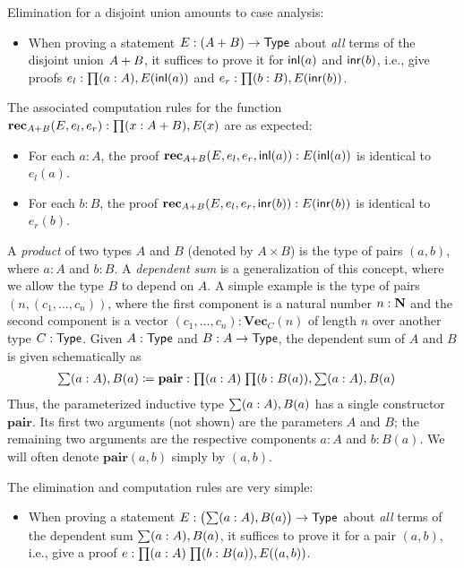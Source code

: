 Elimination for a disjoint union amounts to case analysis:
\begin{itemize}
\item When proving a statement $E : (A + B) \to \mathsf{Type}$ about \emph{all} terms of the disjoint union $A + B$, it suffices to prove it for $\mathsf{inl}(a)$ and $\mathsf{inr}(b)$, i.e., give proofs $e_l : \prd{a:A} E(\inl(a))$ and $e_r : \prd{b:B} E(\inr(b))$.
\end{itemize}
The associated computation rules for the function $\rec_{\disj{A}{B}}(E,e_l,e_r) : \prd{x:\disj{A}{B}} E(x)$ are as expected:
\begin{itemize}
\item For each $a : A$, the proof $\mathbf{rec}_{A + B}(E,e_l,e_r,\mathsf{inl}(a)) : E(\mathsf{inl}(a))$ is identical to $e_l(a)$.
\item For each $b : B$, the proof $\mathbf{rec}_{A + B}(E,e_l,e_r,\mathsf{inr}(b)) : E(\mathsf{inr}(b))$ is identical to $e_r(b)$.
\end{itemize}

A \emph{product} of two types $A$ and $B$ (denoted by $A \times B$) is the type of pairs $(a,b)$, where $a : A$ and $b : B$. A \emph{dependent sum} is a generalization of this concept, where we allow the type $B$ to depend on $A$. A simple example is the type of pairs $(n,(c_1,\ldots,c_n))$, where the first component is a natural number $n : \mathbf{N}$ and the second component is a vector $(c_1,\ldots,c_n) : \mathbf{Vec}_C(n)$ of length $n$ over another type $C : \mathsf{Type}$.
Given $A : \mathsf{Type}$ and $B : A \to \mathsf{Type}$, the dependent sum of $A$ and $B$ is given schematically as
\begin{align*}
  \sm{a:A} B(a) \defeq \; & \mathbf{pair} : \prd{a:A}{b:B(a)} \sm{a:A} B(a)
\end{align*}
Thus, the parameterized inductive type $\sm{a:A} B(a)$ has a single constructor $\mathbf{pair}$. Its first two arguments (not shown) are the parameters $A$ and $B$; the remaining two arguments are the respective components $a : A$ and $b : B(a)$. We will often denote $\mathbf{pair}(a,b)$ simply by $(a,b)$.

The elimination and computation rules are very simple:

\begin{itemize}
\item When proving a statement $E : \big(\sm{a:A} B(a)\big) \to \type$ about \emph{all} terms of the dependent sum $\sm{a:A} B(a)$, it suffices to prove it for a pair $(a,b)$, i.e., give a proof $e : \prd{a:A}{b:B(a)} E((a,b))$.
\end{itemize}

